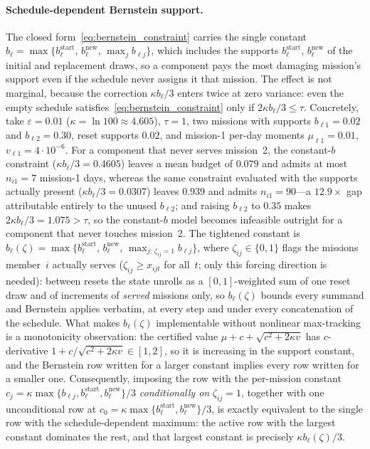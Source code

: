 \documentclass[11pt,a4paper]{article}
\theoremstyle{plain}
\theoremstyle{definition}
\theoremstyle{remark}
\begin{document}
\paragraph{Schedule-dependent Bernstein support.}
The closed form~\eqref{eq:bernstein_constraint} carries the single constant $b_\ell = \max\{b^{\mathrm{start}}_\ell,\, b^{\mathrm{new}}_\ell,\, \max_j b_{\ell j}\}$, which includes the supports $b^{\mathrm{start}}_\ell$, $b^{\mathrm{new}}_\ell$ of the initial and replacement draws, so a component pays the most damaging mission's support even if the schedule never assigns it that mission.
The effect is not marginal, because the correction $\kappa b_\ell/3$ enters twice at zero variance: even the empty schedule satisfies~\eqref{eq:bernstein_constraint} only if $2\kappa b_\ell/3 \le \tau$.
Concretely, take $\varepsilon = 0.01$ ($\kappa = \ln 100 \approx 4.605$), $\tau = 1$, two missions with supports $b_{\ell 1} = 0.02$ and $b_{\ell 2} = 0.30$, reset supports $0.02$, and mission-1 per-day moments $\mu_{\ell 1} = 0.01$, $v_{\ell 1} = 4\cdot 10^{-6}$.
For a component that never serves mission~2, the constant-$b$ constraint ($\kappa b_\ell/3 = 0.4605$) leaves a mean budget of $0.079$ and admits at most $n_{i1} = 7$ mission-1 days, whereas the same constraint evaluated with the supports actually present ($\kappa b_\ell/3 = 0.0307$) leaves $0.939$ and admits $n_{i1} = 90$---a $12.9\times$ gap attributable entirely to the unused $b_{\ell 2}$; and raising $b_{\ell 2}$ to $0.35$ makes $2\kappa b_\ell/3 = 1.075 > \tau$, so the constant-$b$ model becomes infeasible outright for a component that never touches mission~2.
The tightened constant is $b_\ell(\zeta) = \max\bigl\{b^{\mathrm{start}}_\ell,\, b^{\mathrm{new}}_\ell,\, \max_{j:\,\zeta_{ij}=1} b_{\ell j}\bigr\}$, where $\zeta_{ij} \in \{0,1\}$ flags the missions member~$i$ actually serves ($\zeta_{ij} \ge x_{ijt}$ for all~$t$; only this forcing direction is needed): between resets the state unrolls as a $[0,1]$-weighted sum of one reset draw and of increments of \emph{served} missions only, so $b_\ell(\zeta)$ bounds every summand and Bernstein applies verbatim, at every step and under every concatenation of the schedule.
What makes $b_\ell(\zeta)$ implementable without nonlinear max-tracking is a monotonicity observation: the certified value $\mu + c + \sqrt{c^2 + 2\kappa v}$ has $c$-derivative $1 + c/\sqrt{c^2 + 2\kappa v} \in [1,2]$, so it is increasing in the support constant, and the Bernstein row written for a larger constant implies every row written for a smaller one.
Consequently, imposing the row with the per-mission constant $c_j = \kappa\max\{b_{\ell j}, b^{\mathrm{start}}_\ell, b^{\mathrm{new}}_\ell\}/3$ \emph{conditionally on} $\zeta_{ij} = 1$, together with one unconditional row at $c_0 = \kappa\max\{b^{\mathrm{start}}_\ell, b^{\mathrm{new}}_\ell\}/3$, is exactly equivalent to the single row with the schedule-dependent maximum: the active row with the largest constant dominates the rest, and that largest constant is precisely $\kappa b_\ell(\zeta)/3$.
\end{document}
